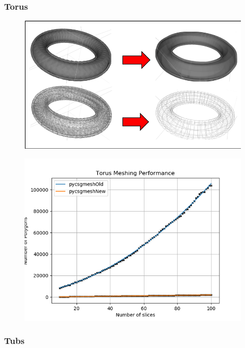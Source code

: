 \documentclass[12pt,a4paper]{article}
\begin{document}
\subsubsection{Torus}

\begin{figure}[h!]
\centering
\begin{minipage}{.2\textwidth}
  \centering
  \includegraphics[height=0.5\linewidth]{Images//Meshes//torus.png}
  \label{fig:test1}
\end{minipage}%
\begin{minipage}{.3\textwidth}
  \centering
  \includegraphics[scale=0.35]{Images//Quad_fits//Torus_quad.png}
  \label{fig:test2}
\end{minipage}%
\end{figure}

\subsubsection{Tubs}
\end{document}

